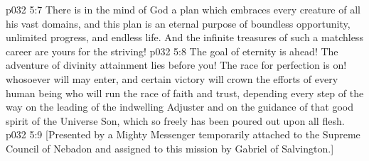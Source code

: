 \vs p032 5:7 \pc There is in the mind of God a plan which embraces every creature of all his vast domains, and this plan is an eternal purpose of boundless opportunity, unlimited progress, and endless life. And the infinite treasures of such a matchless career are yours for the striving!
\vs p032 5:8 The goal of eternity is ahead! The adventure of divinity attainment lies before you! The race for perfection is on! whosoever will may enter, and certain victory will crown the efforts of every human being who will run the race of faith and trust, depending every step of the way on the leading of the indwelling Adjuster and on the guidance of that good spirit of the Universe Son, which so freely has been poured out upon all flesh.
\vsetoff
\vs p032 5:9 [Presented by a Mighty Messenger temporarily attached to the Supreme Council of Nebadon and assigned to this mission by Gabriel of Salvington.]
